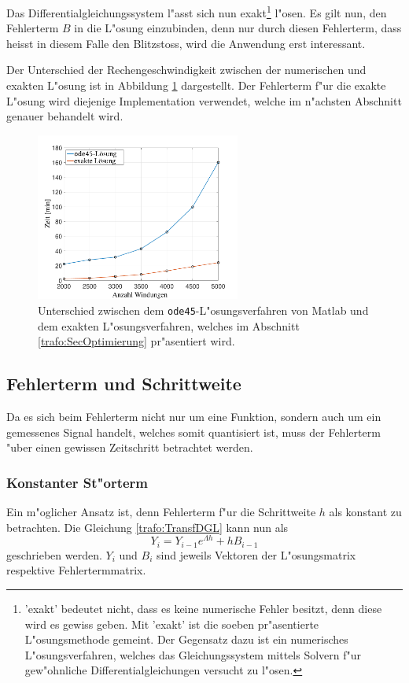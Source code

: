 \begin{refsection}
Das Differentialgleichungssystem l"asst sich nun exakt\footnote{'exakt' bedeutet nicht, dass es keine numerische Fehler besitzt, denn diese wird es gewiss geben. Mit 'exakt' ist die soeben pr"asentierte L"osungsmethode gemeint. Der Gegensatz dazu ist ein numerisches L"osungsverfahren, welches das Gleichungssystem mittels Solvern f"ur gew"ohnliche Differentialgleichungen versucht zu l"osen.} l"osen. Es gilt nun, den Fehlerterm $B$ in die L"osung einzubinden, denn nur durch diesen Fehlerterm, dass heisst in diesem Falle den Blitzstoss, wird die Anwendung erst interessant.

Der Unterschied der Rechengeschwindigkeit zwischen der numerischen und exakten L"osung ist in Abbildung \ref{trafo:ode45vsExact} dargestellt. Der Fehlerterm f"ur die exakte L"osung wird diejenige Implementation verwendet, welche im n"achsten Abschnitt genauer behandelt wird. 

	\begin{figure}
		\centering
		\includegraphics[width=0.6\textwidth]{./trafo/images/ode45vsExact.pdf}
		\caption{Unterschied zwischen dem \texttt{ode45}-L"osungsverfahren von Matlab und dem exakten L"osungsverfahren, welches im Abschnitt \ref{trafo:SecOptimierung} pr"asentiert wird.}
		\label{trafo:ode45vsExact}
	\end{figure}


\subsection{Fehlerterm und Schrittweite}
Da es sich beim Fehlerterm nicht nur um eine Funktion, sondern auch um ein gemessenes Signal handelt, welches somit quantisiert ist, muss der Fehlerterm "uber einen gewissen Zeitschritt betrachtet werden.

\subsubsection{Konstanter St"orterm}
Ein m"oglicher Ansatz ist, denn Fehlerterm f"ur die Schrittweite $h$ als konstant zu betrachten. Die Gleichung \ref{trafo:TransfDGL} kann nun als
\begin{equation*}
	Y_i = Y_{i-1} e^{\Lambda h}  + h B_{i-1}
\end{equation*}
geschrieben werden. $Y_i$ und $B_i$ sind jeweils Vektoren der L"osungsmatrix respektive Fehlertermmatrix. 


\end{refsection}
